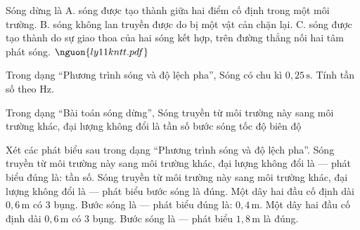\begin{ex}
Sóng dừng là A. sóng được tạo thành giữa hai điểm cố định trong một môi trường. B. sóng không lan truyền được do bị một vật cản chặn lại. C. sóng được tạo thành do sự giao thoa của hai sóng kết hợp, trên đường thẳng nối hai tâm phát sóng. $\nguon{ly11 kntt.pdf}$
\choiceTF

\end{ex}

\begin{ex}
Trong dạng “Phương trình sóng và độ lệch pha”, Sóng có chu kì $0,25\,\text{s}$. Tính tần số theo Hz.
\end{ex}

\begin{ex}
Trong dạng “Bài toán sóng dừng”, Sóng truyền từ môi trường này sang môi trường khác, đại lượng không đổi là
\choice
{\True tần số}
{bước sóng}
{tốc độ}
{biên độ}
\end{ex}

\begin{ex}
Xét các phát biểu sau trong dạng “Phương trình sóng và độ lệch pha”.
\choiceTF
{\True Sóng truyền từ môi trường này sang môi trường khác, đại lượng không đổi là — phát biểu đúng là: tần số.}
{Sóng truyền từ môi trường này sang môi trường khác, đại lượng không đổi là — phát biểu bước sóng là đúng.}
{\True Một dây hai đầu cố định dài $0,6\,\text{m}$ có 3 bụng. Bước sóng là — phát biểu đúng là: $0,4\,\text{m}$.}
{Một dây hai đầu cố định dài $0,6\,\text{m}$ có 3 bụng. Bước sóng là — phát biểu $1,8\,\text{m}$ là đúng.}
\end{ex}

